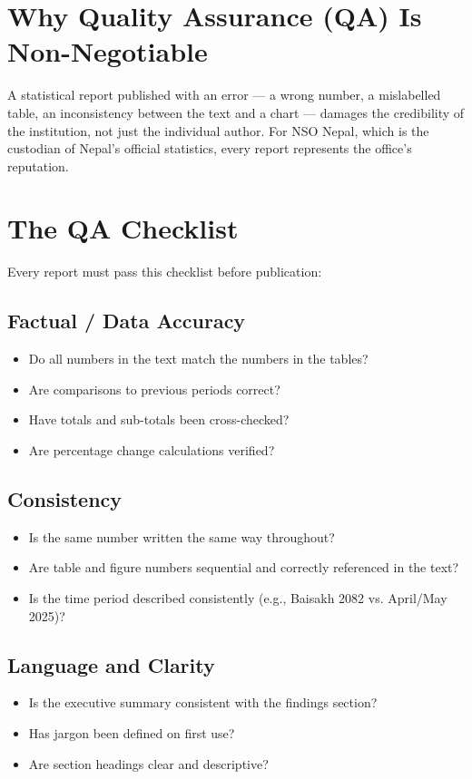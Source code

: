 \documentclass[11pt,a4paper,oneside]{book}
\begin{document}
\section{Why Quality Assurance (QA) Is Non-Negotiable}

A statistical report published with an error --- a wrong number, a mislabelled table, an inconsistency between the text and a chart --- damages the credibility of the institution, not just the individual author. For NSO Nepal, which is the custodian of Nepal's official statistics, every report represents the office's reputation.

\section{The QA Checklist}

Every report must pass this checklist before publication:

\subsection*{Factual / Data Accuracy}
\begin{itemize}
    \item[\(\square\)] Do all numbers in the text match the numbers in the tables?
    \item[\(\square\)] Are comparisons to previous periods correct?
    \item[\(\square\)] Have totals and sub-totals been cross-checked?
    \item[\(\square\)] Are percentage change calculations verified?
\end{itemize}

\subsection*{Consistency}
\begin{itemize}
    \item[\(\square\)] Is the same number written the same way throughout?
    \item[\(\square\)] Are table and figure numbers sequential and correctly referenced in the text?
    \item[\(\square\)] Is the time period described consistently (e.g., Baisakh 2082 vs. April/May 2025)?
\end{itemize}

\subsection*{Language and Clarity}
\begin{itemize}
    \item[\(\square\)] Is the executive summary consistent with the findings section?
    \item[\(\square\)] Has jargon been defined on first use?
    \item[\(\square\)] Are section headings clear and descriptive?
\end{itemize}
\end{document}

